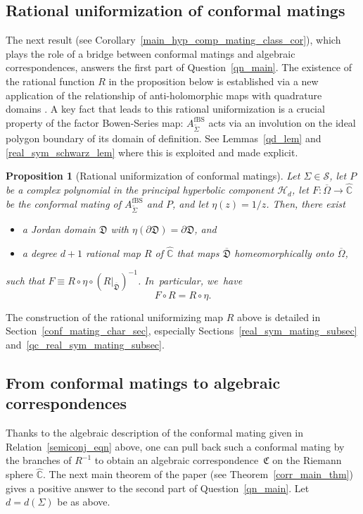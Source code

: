 \documentclass[JEP,XML,SOM,Unicode,NoFloatCountersInSection,published]{cedram}
\newtheorem{proposition}[lemma]{Proposition}
\theoremstyle{definition}
\theoremstyle{remark}
\newcommand{\C}{\mathbb{C}}
\newcommand{\cS}{\mathcal{S}}
\begin{document}
\subsection*{Rational uniformization of conformal matings}
The next result (see Corollary~\ref{main_hyp_comp_mating_class_cor}), which plays the role of a bridge between conformal matings and algebraic correspondences, answers the first part of Question~\ref{qn_main}. The existence of the rational function $R$ in the proposition below is established via a new application of the relationship of anti-holomorphic maps with quadrature domains \cite{LLMM1}. A key fact that leads to this rational uniformization is a crucial property of the factor Bowen-Series map: $A_{\widetilde{\Sigma}}^{\mathrm{fBS}}$ acts via an involution on the ideal polygon boundary of its domain of definition. See Lemmas~\ref{qd_lem} and \ref{real_sym_schwarz_lem} where this is exploited and made explicit.

\begin{proposition}[Rational uniformization of conformal matings]\label{rat_unif_conf_mating_intro_prop}
Let $\Sigma\in\cS$, let $P$ be a complex polynomial in the principal hyperbolic component $\mathcal{H}_d$, let $F:\overline{\Omega}\to\widehat{\C}$ be the conformal mating of $A_{\widetilde{\Sigma}}^{\mathrm{fBS}}$ and $P$, and let $\eta(z)=1/z$.
Then, there exist
\begin{itemize}
\item a Jordan domain $\mathfrak{D}$ with $\eta(\partial\mathfrak{D})=\partial\mathfrak{D}$, and

\item a degree $d+1$ rational map $R$ of $\widehat{\C}$ that maps $\overline{\mathfrak{D}}$ homeomorphically onto $\overline{\Omega}$,
\end{itemize}
such that $F\equiv R\circ\eta\circ (R\vert_{\overline{\mathfrak{D}}})^{-1}$. In~particular, we~have
\begin{equation}\label{semiconj_eqn}
F\circ R = R \circ \eta.
\end{equation}
\end{proposition}

The construction of the rational uniformizing map $R$ above is detailed in Section~\ref{conf_mating_char_sec}, especially Sections~\ref{real_sym_mating_subsec} and~\ref{qc_real_sym_mating_subsec}.

\subsection*{From conformal matings to algebraic correspondences}
Thanks to the algebraic description of the conformal mating given in Relation~\eqref{semiconj_eqn} above, one can pull back such a conformal mating by the branches of $R^{-1}$ to obtain an algebraic \hbox{correspondence}~$\mathfrak{C}$ on the Riemann sphere $\widehat{\C}$.
The next main theorem of the paper (see Theorem~\ref{corr_main_thm}) gives a positive answer to the second part of Question~\ref{qn_main}. Let $d = d(\Sigma)$ be as above.
\end{document}
